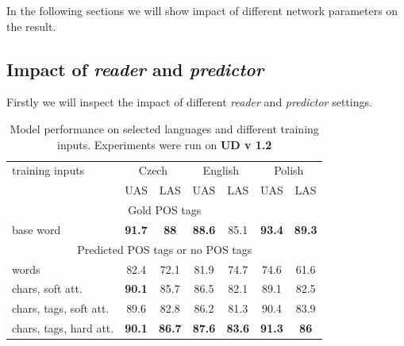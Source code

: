 In the following sections we will show impact of different network parameters
on the result.

\subsection{Impact of \emph{reader} and \emph{predictor}}
Firstly we will inspect the impact of different \emph{reader} and \emph{predictor}
settings.
\begin{table}[!htbp]
  \centering
  \label{tab:results}
  \begin{tabular}{l|cc|cc|cc|}
    training inputs & \multicolumn{2}{c|}{Czech} & \multicolumn{2}{c|}{English} & \multicolumn{2}{c|}{Polish} \\
    & UAS & LAS & UAS & LAS & UAS & LAS \\ 
    \multicolumn{7}{c}{Gold POS tags} \\  \hline
    base word & 
    \textbf{91.7} & \textbf{88} & 
    \textbf{88.6} & 85.1 & 
    \textbf{93.4} & \textbf{89.3} \\
    \multicolumn{7}{c}{Predicted POS tags or no POS tags} \\ \hline
    words & 
    82.4 & 72.1 &
    81.9 & 74.7 & 
    74.6 & 61.6  \\
    chars, soft att. & 
    \textbf{90.1} & 85.7 & %
    86.5 & 82.1 & %
    89.1 & 82.5 \\ %
    chars, tags, soft att. & 
    89.6 & 82.8 & %
    86.2 & 81.3 & %
    90.4 & 83.9 \\ %
    chars, tags, hard att. & 
    \textbf{90.1} & \textbf{86.7} & %
    \textbf{87.6} & \textbf{83.6} & %
    \textbf{91.3} & \textbf{86} \\ %
  \end{tabular}
  \caption{Model performance on selected languages and different training inputs. Experiments were run on \textbf{UD v 1.2}} 
\end{table}

